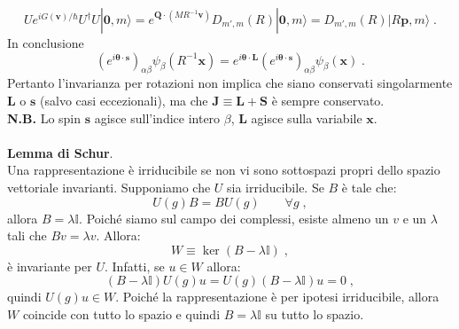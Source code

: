 \documentclass[10pt,a4paper]{report}
\theoremstyle{definition}
\numberwithin{equation}{section}
\newcommand{\ket}{\rangle}
\newcommand{\adj}[1]{#1^{\dagger}}
\begin{document}
\begin{equation}
Ue^{iG(\mathbf{v})/\hbar}\adj{U}U|\mathbf{0},m\ket=e^{\mathbf{Q}\cdot (MR^{-1}\mathbf{v})}D_{m',m}(R)|\mathbf{0},m\ket=D_{m',m}(R)|R\mathbf{p},m\ket\;.
\end{equation}
In conclusione
\begin{equation}
\left(e^{i\boldsymbol{\theta}\cdot\mathbf{s}}\right)_{\alpha\beta}\psi_{\beta}(R^{-1}\mathbf{x})=e^{i\boldsymbol{\theta}\cdot \mathbf{L}}\left(e^{i\boldsymbol{\theta}\cdot\mathbf{s}}\right)_{\alpha\beta}\psi_{\beta}(\mathbf{x})\;.
\end{equation}
Pertanto l'invarianza per rotazioni non implica che siano conservati singolarmente $\mathbf{L}$ o $\mathbf{s}$ (salvo casi eccezionali), ma che $\mathbf{J}\equiv \mathbf{L}+\mathbf{S}$ è sempre conservato. \\
\textbf{N.B.} Lo spin $\mathbf{s}$ agisce sull'indice intero $\beta$, $\mathbf{L}$ agisce sulla variabile $\mathbf{x}$. \\
\\
\textbf{Lemma di Schur}. \\
Una rappresentazione è irriducibile se non vi sono sottospazi propri dello spazio vettoriale invarianti.
\proof
Supponiamo che $U$ sia irriducibile. Se $B$ è tale che:
\begin{equation}
U(g)B=BU(g)\qquad \forall g\;,
\end{equation}
allora $B=\lambda \mathbb{I}$. Poiché siamo sul campo dei complessi, esiste almeno un $v$ e un $\lambda$ tali che $Bv=\lambda v$. Allora:
\begin{equation}
W\equiv \ker (B-\lambda\mathbb{I})\;,
\end{equation}
è invariante per $U$. Infatti, se $u\in W$ allora:
\begin{equation}
(B-\lambda\mathbb{I})U(g)u=U(g)(B-\lambda \mathbb{I})u=0\;,
\end{equation}
quindi $U(g)u\in W$. Poiché la rappresentazione è per ipotesi irriducibile, allora $W$ coincide con tutto lo spazio e quindi $B=\lambda \mathbb{I}$ su tutto lo spazio.
\endproof
\end{document}
